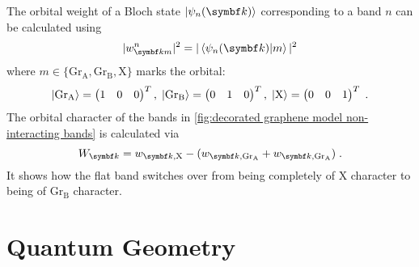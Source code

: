 \documentclass[../main.tex]{subfiles}
\begin{document}
The orbital weight of a Bloch state \(\ket{\psi_n (\vb{k})}\) corresponding to a band \(n\) can be calculated using
\begin{equation}
	\vert w_{\vb{k} m}^n \vert^2 = \vert \braket{\psi_n (\vb{k}) \vert m} \vert^2
\end{equation}
where \(m \in \{\mathrm{Gr}_{\mathrm{A}}, \mathrm{Gr}_{\mathrm{B}}, \mathrm{X}\}\) marks the orbital:
\begin{equation}
	\ket{\mathrm{Gr}_{\mathrm{A}}} = \begin{pmatrix} 1 & 0 & 0 \end{pmatrix}^T,\;
	\ket{\mathrm{Gr}_{\mathrm{B}}} = \begin{pmatrix} 0 & 1 & 0 \end{pmatrix}^T,\;
	\ket{\mathrm{X}} = \begin{pmatrix} 0 & 0 & 1 \end{pmatrix}^T \;.
\end{equation} 
The orbital character of the bands in \cref{fig:decorated graphene model non-interacting bands} is calculated via
\begin{equation}
	W_{\vb{k}} = w_{\vb{k}, \mathrm{X}} - (w_{\vb{k}, \mathrm{Gr}_{\mathrm{A}}} + w_{\vb{k}, \mathrm{Gr}_{\mathrm{A}}})\;.
\end{equation}
It shows how the flat band switches over from being completely of \(\mathrm{X}\) character to being of \(\mathrm{Gr}_{\mathrm{B}}\) character.


\section{Quantum Geometry}\label{sec:decorated graphene quantum metric}
\end{document}
